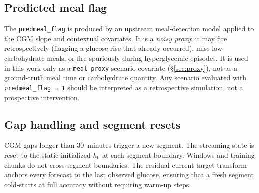 \begin{table}[h]
\centering
\caption{AI-READI cohort characteristics used in this study.  Values are as
  reported in the published dataset description.}
\label{tab:cohort}
\end{table}

\subsection{Predicted meal flag}

The \texttt{predmeal\_flag} is produced by an upstream meal-detection model applied to the
CGM slope and contextual covariates.
It is a \emph{noisy proxy}: it may fire retrospectively (flagging a glucose rise that already
occurred), miss low-carbohydrate meals, or fire spuriously during hyperglycemic episodes.
It is used in this work only as a \texttt{meal\_proxy} scenario covariate
(\S\ref{sec:proxy}), not as a ground-truth meal time or carbohydrate quantity.
Any scenario evaluated with \texttt{predmeal\_flag = 1} should be interpreted as a
retrospective simulation, not a prospective intervention.

\subsection{Gap handling and segment resets}

CGM gaps longer than 30~minutes trigger a new segment.  The streaming state is reset to the
static-initialized $h_0$ at each segment boundary.  Windows and training chunks do not cross
segment boundaries.  The residual-current target transform anchors every forecast to the
last observed glucose, ensuring that a fresh segment cold-starts at full accuracy without
requiring warm-up steps.

